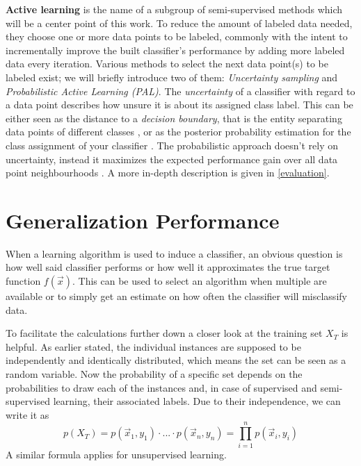 \textbf{Active learning} is the name of a subgroup of semi-supervised methods which will be a center point of this work. To reduce the amount of labeled data needed, they choose one or more data points to be labeled, commonly with the intent to incrementally improve the built classifier's performance by adding more labeled data every iteration. Various methods to select the next data point(s) to be labeled exist; we will briefly introduce two of them: \textit{Uncertainty sampling} and \textit{Probabilistic Active Learning (PAL)}. The \textit{uncertainty} of a classifier with regard to a data point describes how unsure it is about its assigned class label. This can be either seen as the distance to a \textit{decision boundary}, that is the entity separating data points of different classes \cite{SchefferEtAl2001}, or as the posterior probability estimation for the class assignment of your classifier \cite{ZhuEtAl2008}. The probabilistic approach doesn't rely on uncertainty, instead it maximizes the expected performance gain over all data point neighbourhoods \cite{KremplEtAl2014}. A more in-depth description is given in \ref{evaluation}.

\section{Generalization Performance}
When a learning algorithm is used to induce a classifier, an obvious question is how well said classifier performs or how well it approximates the true target function $f(\vec{x})$. This can be used to select an algorithm when multiple are available or to simply get an estimate on how often the classifier will misclassify data.

To facilitate the calculations further down a closer look at the training set $X_T$ is helpful. As earlier stated, the individual instances are supposed to be independently and identically distributed, which means the set can be seen as a random variable. Now the probability of a specific set depends on the probabilities to draw each of the instances and, in case of supervised and semi-supervised learning, their associated labels. Due to their independence, we can write it as 
\begin{equation}
\label{eq:trainingSet}
p(X_T) = p(\vec{x}_1, y_1) \cdot ... \cdot p(\vec{x}_n, y_n) = \prod_{i=1}^{n} p(\vec{x}_i, y_i)
\end{equation}
A similar formula applies for unsupervised learning. \cite{RodriguezEtAl2013}

